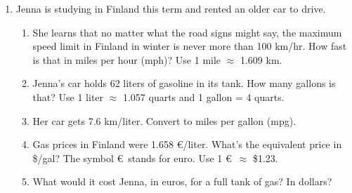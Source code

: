 \begin{enumerate}
\item Jenna is studying in Finland this term and rented an older car to drive.
\begin{enumerate}
\item She learns that no matter what the road signs might say, the maximum speed limit in Finland in winter is never more than 100 km/hr.  How fast is that in miles per hour (mph)? Use 1 mile $\approx$ 1.609 km.\vfill
\item Jenna's car holds 62 liters of gasoline in its tank.  How many gallons is that?  Use 1 liter $\approx$ 1.057 quarts and 1 gallon = 4 quarts. \vfill
\item Her car gets 7.6 km/liter.  Convert to miles per gallon (mpg).  \vfill
\item Gas prices in Finland were 1.658 \euro/liter.  What's the equivalent price in \$/gal?  The symbol \euro~stands for euro. Use 1 \euro~$\approx$ \$1.23.  \vfill
\item What would it cost Jenna, in euros, for a full tank of gas?  In dollars? \vfill \vfill
\end{enumerate}

\end{enumerate}



